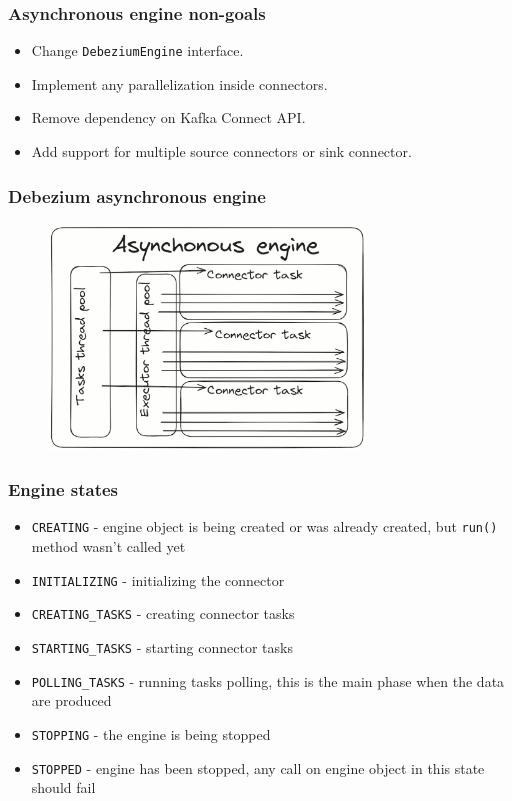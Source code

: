 \documentclass[10pt,utf8]{beamer}
\begin{document}
\begin{frame}
    \frametitle{Asynchronous engine non-goals}
    \begin{itemize}
        \item Change \texttt{DebeziumEngine} interface.
        \item Implement any parallelization inside connectors.
        \item Remove dependency on Kafka Connect API.
        \item Add support for multiple source connectors or sink connector.
    \end{itemize}
\end{frame}


\begin{frame}
    \frametitle{Debezium asynchronous engine}
    \begin{figure}
        \centering
        \includegraphics[height=6cm]{./img/async_engine.eps}
    \end{figure}
\end{frame}

\begin{frame}
    \frametitle{Engine states}
    \begin{itemize}
        \item \texttt{CREATING} - engine object is being created or was already created, but \texttt{run()} method wasn't called yet
        \item \texttt{INITIALIZING} - initializing the connector
        \item \texttt{CREATING\_TASKS} - creating connector tasks
        \item \texttt{STARTING\_TASKS} - starting connector tasks
        \item \texttt{POLLING\_TASKS} - running tasks polling, this is the main phase when the data are produced
        \item \texttt{STOPPING} - the engine is being stopped
        \item \texttt{STOPPED} - engine has been stopped, any call on engine object in this state should fail

    \end{itemize}
\end{frame}
\end{document}
